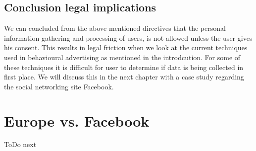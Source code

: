 \documentclass[11pt]{article}
\begin{document}
\subsection{Conclusion legal implications}

We can concluded from the above mentioned directives that the personal information gathering and processing of users, is not allowed unless the user gives his consent. This results in legal friction when we look at the current techniques used in behavioural advertising as mentioned in the introdcution. For some of these techniques it is difficult for user to determine if data is being collected in first place. We will discuss this in the next chapter with a case study regarding the social networking site Facebook.

\section{Europe vs. Facebook}

ToDo next






\end{document}
